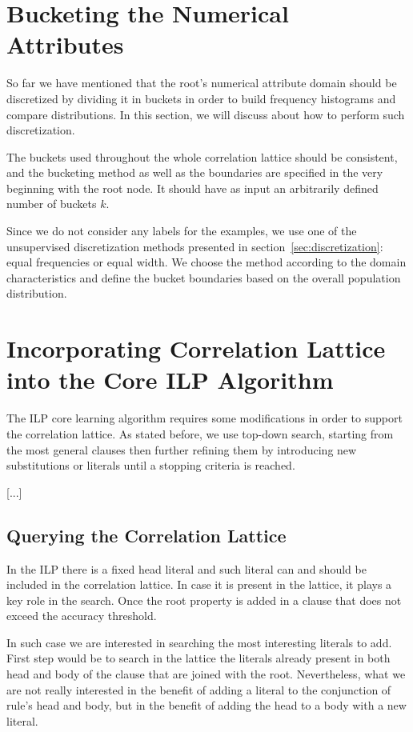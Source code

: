 \section{Bucketing the Numerical Attributes}

So far we have mentioned that the root's numerical attribute domain should be discretized by dividing it in buckets in
order to build frequency histograms and compare distributions. In this section, we will discuss about how to perform
such discretization.

The buckets used throughout the whole correlation lattice should be consistent, and the bucketing method as well as
the
boundaries are specified in the very beginning with the root node. It should have as input an arbitrarily defined
number
of buckets $k$.

Since we do not consider any labels for the examples, we use one of the unsupervised discretization methods presented
in
section~\ref{sec:discretization}: equal frequencies or equal width. We choose the method according to the domain
characteristics and define the bucket boundaries based on the overall population distribution.

\section{Incorporating Correlation Lattice into the Core ILP Algorithm}
\label{sec:incorporation}

The ILP core learning algorithm requires some modifications in order to support the correlation lattice. As stated
before, we use top-down search, starting from the most general clauses then further refining them by introducing
new substitutions or literals until a stopping criteria is reached.

[...]

\subsection{Querying the Correlation Lattice}

In the ILP there is a fixed head literal and such literal can and should be included in the correlation lattice. In
case it is present in the lattice, it plays a key role in the search. Once the root property is added in a clause that
does not exceed the accuracy threshold.

In such case we are interested in searching the most interesting literals to add. First step would be to search in the
lattice the literals already present in both head and body of the clause that are joined with the root. Nevertheless,
what we are not really interested in the benefit of adding a literal to the conjunction of rule's head and body, but
in
the benefit of adding the head to a body with a new literal.

